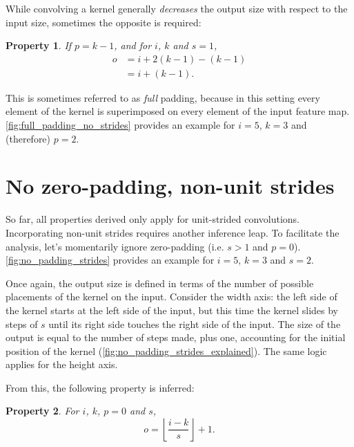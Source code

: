 \documentclass{report}
\newtheorem{prop}{Property}
\begin{document}
While convolving a kernel generally {\em decreases} the output size with respect
to the input size, sometimes the opposite is required:

\begin{prop}\label{prop:full_padding_no_strides}
If $p = k - 1$, and for $i$, $k$ and $s = 1$,
\begin{equation*}
\begin{split}
    o &= i + 2(k - 1) - (k - 1) \\
      &= i + (k - 1).
\end{split}
\end{equation*}
\end{prop}

This is sometimes referred to as {\em full} padding, because in this setting
every element of the kernel is superimposed on every element of the input
feature map. \autoref{fig:full_padding_no_strides} provides an example for $i =
5$, $k = 3$ and (therefore) $p = 2$.

\section{No zero-padding, non-unit strides}

So far, all properties derived only apply for unit-strided convolutions.
Incorporating non-unit strides requires another inference leap. To facilitate
the analysis, let's momentarily ignore zero-padding (i.e.  $s > 1$ and $p = 0$).
\autoref{fig:no_padding_strides} provides an example for $i = 5$, $k = 3$ and $s
= 2$.

Once again, the output size is defined in terms of the number of possible
placements of the kernel on the input. Consider the width axis: the left side of
the kernel starts at the left side of the input, but this time the kernel slides
by steps of $s$ until its right side touches the right side of the input. The
size of the output is equal to the number of steps made, plus one, accounting
for the initial position of the kernel
(\autoref{fig:no_padding_strides_explained}). The same logic applies for the
height axis.

From this, the following property is inferred:

\begin{prop}\label{prop:no_padding_strides}
For $i$, $k$, $p = 0$ and $s$,
\begin{equation*}
    o = \left\lfloor \frac{i - k}{s} \right\rfloor + 1.
\end{equation*}
\end{prop}
\end{document}
